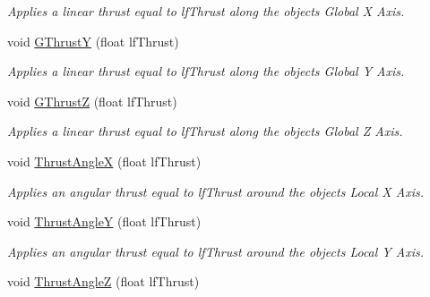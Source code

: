 \begin{DoxyCompactItemize}
\begin{DoxyCompactList}\small\item\em Applies a linear thrust equal to lfThrust along the objects Global X Axis. \end{DoxyCompactList}\item 
\hypertarget{classc_momentum_a0c0c8b1a60ecd2f25f75cad13e09d57f}{
void \hyperlink{classc_momentum_a0c0c8b1a60ecd2f25f75cad13e09d57f}{GThrustY} (float lfThrust)}
\label{classc_momentum_a0c0c8b1a60ecd2f25f75cad13e09d57f}

\begin{DoxyCompactList}\small\item\em Applies a linear thrust equal to lfThrust along the objects Global Y Axis. \end{DoxyCompactList}\item 
\hypertarget{classc_momentum_a3d140c25bb390b1b37a93bc917fb27c6}{
void \hyperlink{classc_momentum_a3d140c25bb390b1b37a93bc917fb27c6}{GThrustZ} (float lfThrust)}
\label{classc_momentum_a3d140c25bb390b1b37a93bc917fb27c6}

\begin{DoxyCompactList}\small\item\em Applies a linear thrust equal to lfThrust along the objects Global Z Axis. \end{DoxyCompactList}\item 
\hypertarget{classc_momentum_afb154e00f9bc7a8c38a2c52dfb899a21}{
void \hyperlink{classc_momentum_afb154e00f9bc7a8c38a2c52dfb899a21}{ThrustAngleX} (float lfThrust)}
\label{classc_momentum_afb154e00f9bc7a8c38a2c52dfb899a21}

\begin{DoxyCompactList}\small\item\em Applies an angular thrust equal to lfThrust around the objects Local X Axis. \end{DoxyCompactList}\item 
\hypertarget{classc_momentum_aa1356ba99d9cd0150b2ad52858a1f827}{
void \hyperlink{classc_momentum_aa1356ba99d9cd0150b2ad52858a1f827}{ThrustAngleY} (float lfThrust)}
\label{classc_momentum_aa1356ba99d9cd0150b2ad52858a1f827}

\begin{DoxyCompactList}\small\item\em Applies an angular thrust equal to lfThrust around the objects Local Y Axis. \end{DoxyCompactList}\item 
\hypertarget{classc_momentum_abaf5e48af42bb5a865145297af403eaa}{
void \hyperlink{classc_momentum_abaf5e48af42bb5a865145297af403eaa}{ThrustAngleZ} (float lfThrust)}
\label{classc_momentum_abaf5e48af42bb5a865145297af403eaa}


\end{DoxyCompactItemize}
